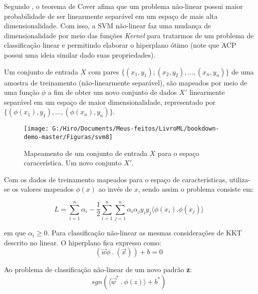 \documentclass[
  openany]{book}
\begin{document}
Segundo \citet{smola2000introduction}, o teorema de Cover afima que um problema não-linear possui maior probabilidade de ser linearmente separável em um espaço de mais alta dimensionalidade. Com isso, a SVM não-linear faz uma mudança de dimensionalidade por meio das funções \emph{Kernel} para tratarmos de um problema de classificação linear e permitindo elaborar o hiperplano ótimo (note que ACP possui uma ideia similar dado suas propriedades).

Um conjunto de entrada \(X\) com pares \(\{(x_1,y_1);(x_2,y_2),...,(x_n,y_n)\}\) de uma amostra de treinamento (não-linearmente separável), são mapeados por meio de uma função \(\phi\) a fim de obter um novo conjunto de dados \(X'\) linearmente separável em um espaço de maior dimensionalidade, representado por \(\{(\phi(x_1),y_1),...,(\phi(x_n),y_n)\}\).

\begin{figure}

{\centering \texttt{[image: G:/Hiro/Documents/Meus-feitos/LivroML/bookdown-demo-master/Figuras/svm8]} 

}

\caption{Mapeamento de um conjunto de entrada \(X\) para o espaço caracerística. Um novo conjunto \(X'\).}\label{fig:svm8}
\end{figure}



Com os dados de treinamento mapeados para o espaço de características, utiliza-se os valores mapeados \(\phi(x)\) ao invés de \(x\), sendo assim o problema consiste em:

\begin{equation} 
L =\displaystyle \sum^n_{i=1}\alpha_i-\frac{1}{2} \displaystyle \sum^n_{i=1}\sum^n_{j=1}\alpha_i\alpha_j y_i y_j \langle \phi(x_i).\phi(x_j)\rangle
\label{eq:svnphi}
\end{equation}

em que \(\alpha_i \geq 0\). Para classificação não-linear as mesmas considerações de KKT descrito no linear. O hiperplano fica expresso como:
\begin{equation}
(\vec{w}\phi \ . \ (\vec{x}))+b=0
\label{eq:hipotimophi}
\end{equation}

Ao problema de classificação não-linear de um novo padrão \textbf{z}:
\begin{equation}
sgn(\langle \vec{w}^* \ . \ \phi(z)\rangle+b^*)
\label{eq:naolinzphi}
\end{equation}
\end{document}
